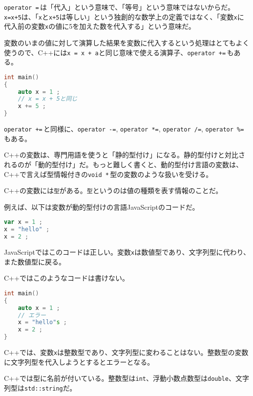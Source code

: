 \texttt{operator =}\,は「代入」という意味で、「等号」という意味ではないからだ。\texttt{x=x+5}は、「\texttt{x}と\texttt{x+5}は等しい」という独創的な数学上の定義ではなく、「変数\texttt{x}に代入前の変数\texttt{x}の値に5を加えた数を代入する」という意味だ。

変数のいまの値に対して演算した結果を変数に代入するという処理はとてもよく使うので、C++には\texttt{x = x + a}と同じ意味で使える演算子、\texttt{operator +=}\,もある。

\begin{lstlisting}[language={C++}]
int main()
{
    auto x = 1 ;
    // x = x + 5と同じ
    x += 5 ;
}
\end{lstlisting}

\texttt{operator +=}\,と同様に、\texttt{operator -=}, \texttt{operator *=}, \texttt{operator /=}, \texttt{operator \%=}\,もある。

C++の変数は、専門用語を使うと「静的型付け」になる。静的型付けと対比されるのが「動的型付け」だ。もっと難しく書くと、動的型付け言語の変数は、C++で言えば型情報付きの\texttt{void *}\,型の変数のような扱いを受ける。

C++の変数には\texttt{型}がある。\texttt{型}というのは値の種類を表す情報のことだ。

例えば、以下は変数が動的型付けの言語JavaScriptのコードだ。

\begin{lstlisting}[language=JavaScript]
var x = 1 ;
x = "hello" ;
x = 2 ;
\end{lstlisting}

JavaScriptではこのコードは正しい。変数\texttt{x}は数値型であり、文字列型に代わり、また数値型に戻る。

C++ではこのようなコードは書けない。

\begin{lstlisting}[language={C++}]
int main()
{
    auto x = 1 ;
    // エラー
    x = "hello"s ;
    x = 2 ;
}
\end{lstlisting}

C++では、変数\texttt{x}は整数型であり、文字列型に変わることはない。整数型の変数に文字列型を代入しようとするとエラーとなる。

C++では型に名前が付いている。整数型は\texttt{int}、浮動小数点数型は\texttt{double}、文字列型は\texttt{std::string}だ。

